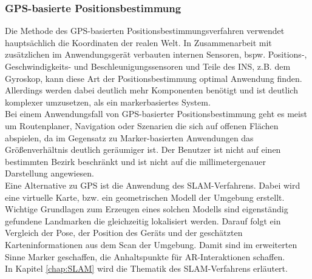 \subsubsection*{\acs{GPS}-basierte Positionsbestimmung}
Die Methode des \acs{GPS}-basierten Positionsbestimmungsverfahren verwendet hauptsächlich die Koordinaten der realen Welt. In Zusammenarbeit 
mit zusätzlichen im Anwendungsgerät verbauten internen Sensoren, bspw. Positions-, Geschwindigkeits- und Beschleunigungssensoren und Teile des 
\ac{INS}, z.B. dem Gyroskop, kann diese Art der Positionsbestimmung optimal Anwendung finden. Allerdings werden dabei deutlich mehr Komponenten
benötigt und ist deutlich komplexer umzusetzen, als ein markerbasiertes System. 
\\ 
Bei einem Anwendungsfall von \acs{GPS}-basierter Positionsbestimmung geht es meist um Routenplaner, Navigation oder Szenarien die sich 
auf offenen Flächen abspielen, da im Gegensatz zu Marker-basierten Anwendungen das Größenverhältnis deutlich geräumiger ist. Der Benutzer ist 
nicht auf einen bestimmten Bezirk beschränkt und ist nicht auf die millimetergenauer Darstellung angewiesen.
\\ 
\linebreak
Eine Alternative zu \acs{GPS} ist die Anwendung des \acs{SLAM}-Verfahrens. Dabei wird eine virtuelle Karte, bzw. ein geometrischen Modell der 
Umgebung erstellt. Wichtige Grundlagen zum Erzeugen eines solchen Modells sind eigenständig gefundene Landmarken die gleichzeitig 
lokalisiert werden. Darauf folgt ein Vergleich der Pose, der Position des Geräts und der geschätzten Karteninformationen aus dem Scan der 
Umgebung. 
Damit sind im erweiterten Sinne Marker geschaffen, die Anhaltspunkte für \acl{AR}-Interaktionen schaffen.
\\ 
In Kapitel \ref{chap:SLAM} wird die Thematik des \acs{SLAM}-Verfahrens erläutert. 

